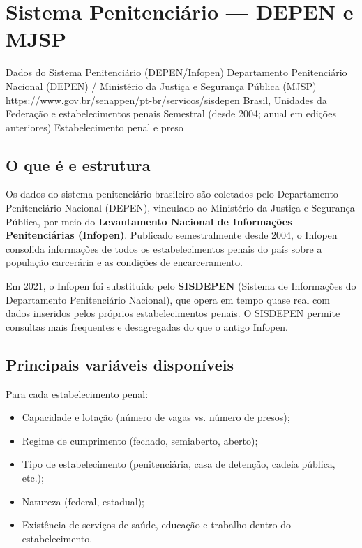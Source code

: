 \section{Sistema Penitenciário — DEPEN e MJSP}

\ficharapida
  {Dados do Sistema Penitenciário (DEPEN/Infopen)}
  {Departamento Penitenciário Nacional (DEPEN) / Ministério da Justiça e Segurança Pública (MJSP)}
  {https://www.gov.br/senappen/pt-br/servicos/sisdepen}
  {Brasil, Unidades da Federação e estabelecimentos penais}
  {Semestral (desde 2004; anual em edições anteriores)}
  {Estabelecimento penal e preso}

\subsection{O que é e estrutura}

Os dados do sistema penitenciário brasileiro são coletados pelo Departamento Penitenciário Nacional (DEPEN), vinculado ao Ministério da Justiça e Segurança Pública, por meio do \textbf{Levantamento Nacional de Informações Penitenciárias (Infopen)}. Publicado semestralmente desde 2004, o Infopen consolida informações de todos os estabelecimentos penais do país sobre a população carcerária e as condições de encarceramento.

Em 2021, o Infopen foi substituído pelo \textbf{SISDEPEN} (Sistema de Informações do Departamento Penitenciário Nacional), que opera em tempo quase real com dados inseridos pelos próprios estabelecimentos penais. O SISDEPEN permite consultas mais frequentes e desagregadas do que o antigo Infopen.

\subsection{Principais variáveis disponíveis}

Para cada estabelecimento penal:
\begin{itemize}
  \item Capacidade e lotação (número de vagas vs. número de presos);
  \item Regime de cumprimento (fechado, semiaberto, aberto);
  \item Tipo de estabelecimento (penitenciária, casa de detenção, cadeia pública, etc.);
  \item Natureza (federal, estadual);
  \item Existência de serviços de saúde, educação e trabalho dentro do estabelecimento.
\end{itemize}

